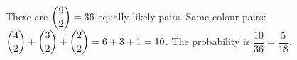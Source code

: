 There are $\dbinom92=36$ equally likely pairs. Same-colour pairs: $\dbinom42+\dbinom32+\dbinom22=6+3+1=10$. The probability is $\dfrac{10}{36}=\boxed{\dfrac{5}{18}}$.
